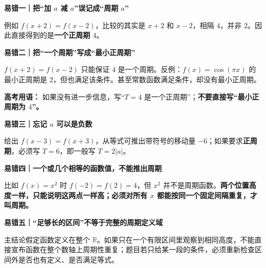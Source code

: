 \clearpage
\begin{trapbox}
\textbf{\textcolor{CTrap}{易错一｜把“加 $a$ 减 $a$”误记成“周期 $a$”}}



例如 $f(x+2)=f(x-2)$，比较的其实是 $x+2$ 和 $x-2$，相隔 $4$，并非 $2$。因此直接得到的是\textbf{一个正周期 $4$}。

\medskip

\end{trapbox}
\clearpage
\begin{trapbox}
\textbf{\textcolor{CTrap}{易错二｜把“一个周期”写成“最小正周期”}}



$f(x+2)=f(x-2)$ 只能保证 $4$ 是一个周期。反例：$f(x)=\cos(\pi x)$ 的最小正周期是 $2$，但也满足该条件。甚至常数函数满足条件，却没有最小正周期。

\textbf{高考用语：} 如果没有进一步信息，写“$T=4$ 是一个正周期”；\textbf{不要直接写“最小正周期为 $4$”。}

\medskip

\end{trapbox}
\clearpage
\begin{trapbox}
\textbf{\textcolor{CTrap}{易错三｜忘记 $a$ 可以是负数}}



给出 $f(x-3)=f(x+3)$，从等式可推出带符号的移动量 $-6$；如果要求\textbf{正周期}，必须写 $T=6$，即一般写 $T=2|a|$。

\medskip

\end{trapbox}
\clearpage
\begin{trapbox}
\textbf{\textcolor{CTrap}{易错四｜一个或几个相等的函数值，不能推出周期}}



比如 $f(x)=x^2$ 时 $f(-2)=f(2)=4$，但 $x^2$ 并不是周期函数。\textbf{两个位置高度一样，只能说明这两点一样高；必须对所有 $x$ 都能按同一个固定间隔重复，才叫周期。}

\medskip

\end{trapbox}
\clearpage
\begin{trapbox}
\textbf{\textcolor{CTrap}{易错五｜“足够长的区间”不等于完整的周期定义域}}



主结论假定函数定义在整个 $\mathbb R$。如果只在一个有限区间里观察到相同高度，不能直接宣布函数在整个数轴上周期性重复；题目若只给某一段的条件，必须重新检查区间外是否也有定义、是否满足等式。

\medskip

\end{trapbox}
